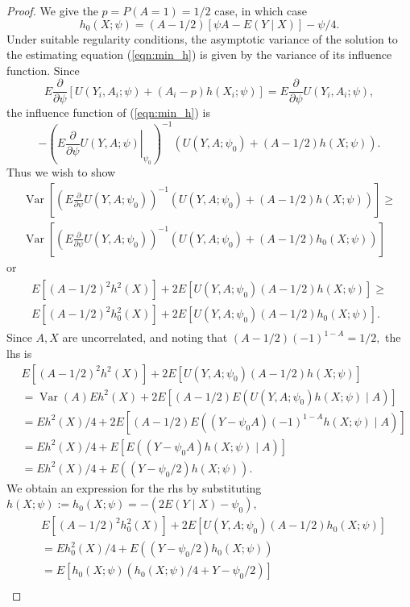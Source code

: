 \message{ !name(manuscript.tex)}\documentclass[10pt,a4paper]{amsart}
\newcommand{\EE}{E}
\newcommand{\PP}{P}
\DeclareMathOperator{\Var}{Var}
\begin{document}
\begin{proof}
  We give the $p=\PP(A=1)=1/2$ case, in which case
  \[ h_0(X;\psi)=(A-1/2)[\psi A-\EE(Y\mid X)]-\psi/4.\]
  Under suitable regularity conditions, the asymptotic
  variance of the solution to the estimating equation
  (\ref{eqn:min_h}) is given by the variance of its influence
  function. Since
  \[ \EE \frac{\partial}{\partial\psi}[U(Y_i,A_i;\psi) + (A_i-p)h(X_i;\psi)]=\EE \frac{\partial}{\partial\psi}U(Y_i,A_i;\psi),
  \]
  the influence function of (\ref{eqn:min_h}) is
  \[
  -\left(\EE\left.\frac{\partial}{\partial\psi}U(Y,A;\psi) \right\vert_{\psi_0}\right)^{-1}(U(Y,A;\psi_0)+(A-1/2)h(X;\psi)).
\]
Thus we wish to show
\begin{align*}
  \Var\left[\left(\EE\frac{\partial}{\partial\psi}U(Y,A;\psi_0)\right)^{-1}(U(Y,A;\psi_0)+(A-1/2)h(X;\psi))\right]\ge\\
   \Var\left[\left(\EE\frac{\partial}{\partial\psi}U(Y,A;\psi_0)\right)^{-1}(U(Y,A;\psi_0)+(A-1/2)h_0(X;\psi))\right]
\end{align*}
or
\begin{gather}
\begin{aligned}\label{lemma:min_h:step_1}
  \EE[(A-1/2)^2h^2(X)] + 2\EE[U(Y,A;\psi_0)(A-1/2)h(X;\psi)] \ge\\
  \EE[(A-1/2)^2h_0^2(X)] + 2\EE[U(Y,A;\psi_0)(A-1/2)h_0(X;\psi)].
\end{aligned}
\end{gather}
Since $A,X$ are uncorrelated, and noting that $(A-1/2)(-1)^{1-A}=1/2,$ the lhs is
\begin{align*}
  &\EE[(A-1/2)^2h^2(X)] + 2\EE[U(Y,A;\psi_0)(A-1/2)h(X;\psi)]\\
  &=\Var(A)\EE h^2(X) + 2\EE[(A-1/2)\EE(U(Y,A;\psi_0)h(X;\psi)\mid A)]\\
  &= \EE h^2(X)/4 + 2\EE[(A-1/2)\EE((Y-\psi_0 A)(-1)^{1-A}h(X;\psi)\mid A)]\\
  &= \EE h^2(X)/4 + \EE[\EE((Y-\psi_0 A)h(X;\psi)\mid A)]\\
    &= \EE h^2(X)/4 + \EE((Y-\psi_0/2)h(X;\psi)).
\end{align*}
We obtain an expression for the rhs by substituting $h(X;\psi):=h_0(X;\psi)=-(2\EE(Y\mid
X)-\psi_0),$
\begin{align*}
  &\EE[(A-1/2)^2h_0^2(X)] + 2\EE[U(Y,A;\psi_0)(A-1/2)h_0(X;\psi)]\\
  &= \EE h_0^2(X)/4 + \EE((Y-\psi_0/2)h_0(X;\psi))\\
  &= \EE[h_0(X;\psi)(h_0(X;\psi)/4 + Y - \psi_0/2)]\\

\end{align*}
\end{proof}
\end{document}
